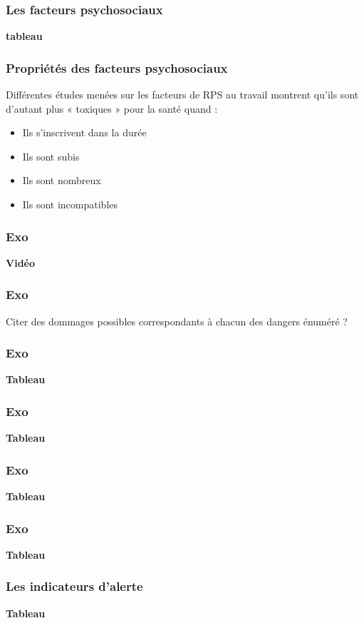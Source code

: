 \documentclass{beamer}
\begin{document}
\begin{frame}
\frametitle{Les facteurs psychosociaux}
\textbf{tableau}
\end{frame}


\begin{frame}
\frametitle{Propriétés des facteurs psychosociaux}
Différentes études menées sur les facteurs de RPS au travail montrent qu’ils sont d’autant plus « toxiques » pour la santé quand :
\begin{itemize}
\item Ils s’inscrivent dans la durée
\item Ils sont subis
\item Ils sont nombreux
\item Ils sont incompatibles
\end{itemize}
\end{frame}

\begin{frame}
\frametitle{Exo}
\textbf{Vidéo}
\end{frame}

\begin{frame}
\frametitle{Exo}
Citer des dommages possibles correspondants à chacun des dangers énuméré ? 
\end{frame}

\begin{frame}
\frametitle{Exo}
\textbf{Tableau}
\end{frame}

\begin{frame}
\frametitle{Exo}
\textbf{Tableau}
\end{frame}

\begin{frame}
\frametitle{Exo}
\textbf{Tableau}
\end{frame}

\begin{frame}
\frametitle{Exo}
\textbf{Tableau}
\end{frame}

\begin{frame}
\frametitle{Les indicateurs d’alerte}
\textbf{Tableau}
\end{frame}
\end{document}
